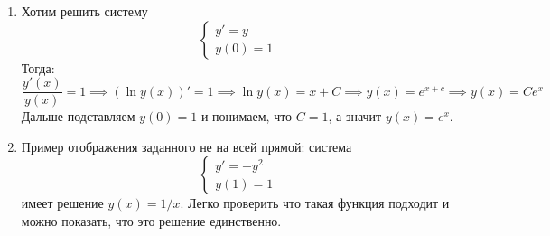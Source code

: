 \begin{examples}
  \begin{enumerate}
    \item
    Хотим решить систему
    \begin{equation*}
      \begin{cases}
        y' = y \\
        y(0) = 1
      \end{cases}
    \end{equation*}
    Тогда:
    \begin{equation*}
      \frac{y'(x)}{y(x)} = 1 \implies (\ln y(x))' = 1 \implies \ln y(x) = x + C \implies y(x) = e^{x + c} \implies y(x) = Ce^x
    \end{equation*}
    Дальше подставляем $y(0) = 1$ и понимаем, что $C = 1$, а значит $y(x) = e^x$.

    \item
    Пример отображения заданного не на всей прямой: система
    \begin{equation*}
      \begin{cases}
        y' = -y^2 \\
        y(1) = 1
      \end{cases}
    \end{equation*}
    имеет решение $y(x) = 1/x$. Легко проверить что такая функция подходит и можно показать, что это решение единственно.
  \end{enumerate}
\end{examples}

